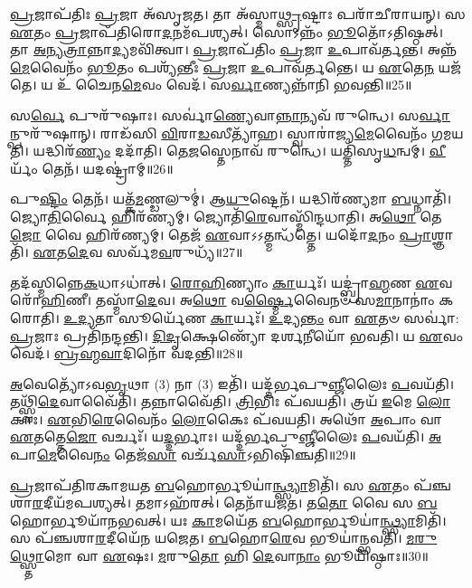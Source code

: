 \-\ul{𑌪𑍍𑌰}\-𑌜𑌾\-𑌪᳴𑌤𑌿𑌃 \ul{𑌪𑍍𑌰}\-𑌜𑌾 𑌅᳴\-𑌸𑍃𑌜𑌤।
𑌤𑌾 𑌅᳴𑌸𑍍𑌮𑌾\-\ul{𑌥𑍍𑌸𑍃}\-𑌷𑍍𑌟𑌾𑌃 𑌪𑌰𑌾᳴𑌚𑍀𑌰𑌾𑌯𑌨𑍍।
𑌸 \ul{𑌏}\-𑌤𑌂 \ul{𑌪𑍍𑌰}\-𑌜𑌾𑌪᳴𑌤𑌿𑌰𑍋\-\ul{𑌦}\-𑌨𑌮᳴𑌪𑌶𑍍𑌯𑌤𑍍।
𑌸𑍋𑌽𑌨𑍍𑌨𑌂᳴ \ul{𑌭𑍂}\-𑌤𑍋᳴\-𑌽𑌤𑌿𑌷𑍍𑌠𑌤𑍍।
𑌤𑌾 \ul{𑌅}\-𑌨𑍍𑌯\-\ul{𑌤𑍍𑌰𑌾}\-𑌨𑍍𑌨𑌾\-\ul{𑌦𑍍𑌯}\-𑌮𑌵𑌿᳴𑌤𑍍𑌵𑌾।
\-\ul{𑌪𑍍𑌰}\-𑌜𑌾𑌪᳴𑌤𑌿𑌂 \ul{𑌪𑍍𑌰}\-𑌜𑌾 \ul{𑌉}\-𑌪𑌾𑌵᳴𑌰𑍍𑌤𑌨𑍍𑌤।
𑌅𑌨𑍍𑌨᳴\-\ul{𑌮𑍇}\-𑌵𑍈𑌨𑌂᳴ \ul{𑌭𑍂}\-𑌤𑌂 𑌪𑌶𑍍𑌯᳴𑌨𑍍𑌤𑍀𑌃 \ul{𑌪𑍍𑌰}\-𑌜𑌾 \ul{𑌉}\-𑌪𑌾𑌵᳴𑌰𑍍𑌤𑌨𑍍𑌤𑍇।
𑌯 \ul{𑌏}\-𑌤𑍇\-\ul{𑌨} 𑌯𑌜᳴𑌤𑍇।
𑌯 𑌉᳴ 𑌚𑍈𑌨\-\ul{𑌮𑍇}\-𑌵𑌂 𑌵𑍇𑌦᳴।
𑌸\-\ul{𑌰𑍍𑌵𑌾}\-𑌣𑍍𑌯𑌨𑍍𑌨𑌾᳴𑌨𑌿 𑌭𑌵𑌨𑍍𑌤𑌿॥25॥

𑌸\-\ul{𑌰𑍍𑌵𑍇} 𑌪𑍁𑌰𑍁᳴𑌷𑌾𑌃।
𑌸𑌰𑍍𑌵𑌾॑\-\ul{𑌣𑍍𑌯𑍇}\-𑌵𑌾\-\ul{𑌨𑍍𑌨𑌾}\-𑌨𑍍𑌯𑌵᳴ 𑌰𑍁𑌨𑍍𑌧𑍇।
𑌸\-\ul{𑌰𑍍𑌵𑌾}\-𑌨𑍍𑌪𑍁𑌰𑍁᳴𑌷𑌾𑌨𑍍।
𑌰𑌾𑌡᳴𑌸𑌿 \ul{𑌵𑌿}\-𑌰𑌾\-\ul{𑌡}\-𑌸𑍀𑌤𑍍𑌯𑌾᳴𑌹।
𑌸𑍍𑌵𑌾𑌰𑌾॑𑌜𑍍𑌯\-\ul{𑌮𑍇}\-𑌵𑍈𑌨𑌂᳴ 𑌗𑌮𑌯𑌤𑌿।
𑌯𑌦𑍍𑌧𑌿𑌰᳴\-\ul{𑌣𑍍𑌯𑌂} 𑌦𑌦𑌾᳴𑌤𑌿।
𑌤𑍇\-\ul{𑌜}\-𑌸𑍍𑌤𑍇𑌨𑌾𑌵᳴ 𑌰𑍁𑌨𑍍𑌧𑍇।
𑌯𑌤𑍍𑌤𑌿᳴𑌸𑍃\-\ul{𑌧}\-𑌨𑍍𑌵𑌮𑍍।
\-\ul{𑌵𑍀}\-𑌰𑍍𑌯𑌂᳴ 𑌤𑍇𑌨᳴।
𑌯𑌦𑌷𑍍𑌟𑍍𑌰𑌾॑𑌮𑍍॥26॥

𑌪𑍁\-\ul{𑌷𑍍𑌟𑌿𑌂} 𑌤𑍇𑌨᳴।
𑌯𑌤𑍍𑌕᳴\-\ul{𑌮}\-𑌣𑍍𑌡𑌲𑍁𑌮𑍍॑।
𑌆\-\ul{𑌯𑍁}\-𑌷𑍍𑌟𑍇𑌨᳴।
𑌯𑌦𑍍𑌧𑌿𑌰᳴𑌣𑍍𑌯𑌮𑌾 \ul{𑌬}\-𑌧𑍍𑌨𑌾𑌤𑌿᳴।
𑌜𑍍𑌯𑍋\-\ul{𑌤𑌿}\-𑌰𑍍𑌵𑍈 𑌹𑌿𑌰᳴𑌣𑍍𑌯𑌮𑍍।
𑌜𑍍𑌯𑍋𑌤𑌿᳴\-\ul{𑌰𑍇}\-𑌵𑌾𑌸𑍍𑌮𑌿᳴𑌨𑍍𑌦𑌧𑌾𑌤𑌿।
𑌅\-\ul{𑌥𑍋} 𑌤𑍇\-\ul{𑌜𑍋} 𑌵𑍈 𑌹𑌿𑌰᳴𑌣𑍍𑌯𑌮𑍍।
𑌤𑍇𑌜᳴ \ul{𑌏}\-𑌵𑌾𑌽𑌽𑌤𑍍𑌮𑌨𑍍𑌧᳴𑌤𑍍𑌤𑍇।
𑌯𑌦𑍋᳴\-\ul{𑌦}\-𑌨𑌂 \ul{𑌪𑍍𑌰𑌾}\-𑌶𑍍𑌞𑌾𑌤𑌿᳴।
\-\ul{𑌏}\-𑌤\-\ul{𑌦𑍇}\-𑌵 𑌸𑌰𑍍𑌵᳴𑌮\-\ul{𑌵}\-𑌰𑍁𑌧𑍍𑌯᳴॥27॥

𑌤𑌦᳴𑌸𑍍𑌮𑌿𑌨𑍍𑌨𑍇\-\ul{𑌕}\-𑌧𑌾\-𑌽𑌧𑌾॑𑌤𑍍।
\-\ul{𑌰𑍋}\-\-\ul{𑌹𑌿}\-𑌣𑍍𑌯𑌾𑌂 \ul{𑌕𑌾}\-𑌰𑍍𑌯𑌃᳴।
𑌯𑌦𑍍𑌬𑍍𑌰𑌾॑\-\ul{𑌹𑍍𑌮}\-𑌣 \ul{𑌏}\-𑌵 𑌰𑍋᳴\-\ul{𑌹𑌿}\-𑌣𑍀।
𑌤𑌸𑍍𑌮𑌾᳴\-\ul{𑌦𑍇}\-𑌵।
𑌅\-\ul{𑌥𑍋} 𑌵\-\ul{𑌰𑍍𑌷𑍍𑌮𑍈}\-𑌵𑍈𑌨𑍞᳴ 𑌸\-\ul{𑌮𑌾}\-𑌨𑌾𑌨𑌾𑌂॑ 𑌕𑌰𑍋𑌤𑌿।
\-\ul{𑌉}\-\-\ul{𑌦𑍍𑌯}\-𑌤𑌾 𑌸𑍂𑌰𑍍𑌯𑍇᳴𑌣 \ul{𑌕𑌾}\-𑌰𑍍𑌯𑌃᳴।
\-\ul{𑌉}\-𑌦𑍍𑌯\-\ul{𑌨𑍍𑌤𑌂} 𑌵𑌾 \ul{𑌏}\-𑌤𑍞 𑌸𑌰𑍍𑌵𑌾॑: \ul{𑌪𑍍𑌰}\-𑌜𑌾𑌃 𑌪𑍍𑌰𑌤𑌿᳴\-𑌨𑌨𑍍𑌦𑌨𑍍𑌤𑌿।
\-\ul{𑌦𑌿}\-\-\ul{𑌦𑍃}\-𑌕𑍍𑌷𑍇𑌣𑍍𑌯𑍋᳴ 𑌦𑌰𑍍\mbox{}\-\ul{𑌶}\-𑌨𑍀𑌯𑍋᳴ 𑌭𑌵𑌤𑌿।
𑌯 \ul{𑌏}\-𑌵𑌂 𑌵𑍇𑌦᳴।
\-\ul{𑌬𑍍𑌰}\-\-\ul{𑌹𑍍𑌮}\-\-\ul{𑌵𑌾}\-𑌦𑌿𑌨𑍋᳴ 𑌵𑌦𑌨𑍍𑌤𑌿॥28॥

\-\ul{𑌅}\-𑌵𑍇𑌤𑍍𑌯𑍋᳴\-𑌽𑌵\-\ul{𑌭𑍃}\-𑌥𑌾 (3) 𑌨𑌾 (3) 𑌇𑌤𑌿᳴।
𑌯𑌦𑍍𑌦᳴𑌰𑍍𑌭𑌪𑍁\-\ul{𑌞𑍍𑌜𑍀}\-𑌲𑍈𑌃 \ul{𑌪}\-𑌵𑌯᳴𑌤𑌿।
𑌤𑌥𑍍𑌸𑍍𑌵𑌿᳴\-\ul{𑌦𑍇}\-𑌵𑌾𑌵𑍈᳴𑌤𑌿।
𑌤𑌨𑍍𑌨𑌾𑌵𑍈᳴𑌤𑌿।
\-\ul{𑌤𑍍𑌰𑌿}\-𑌭𑌿𑌃 𑌪᳴𑌵𑌯𑌤𑌿।
𑌤𑍍𑌰𑌯᳴ \ul{𑌇}\-𑌮𑍇 \ul{𑌲𑍋}\-𑌕𑌾𑌃।
\-\ul{𑌏}\-𑌭𑌿\-\ul{𑌰𑍇}\-𑌵𑍈𑌨𑌂᳴ \ul{𑌲𑍋}\-𑌕𑍈𑌃 𑌪᳴𑌵𑌯𑌤𑌿।
𑌅𑌥𑍋᳴ \ul{𑌅}\-𑌪𑌾𑌂 𑌵𑌾 \ul{𑌏}\-𑌤𑌤𑍍𑌤𑍇\-\ul{𑌜𑍋} 𑌵𑌰𑍍𑌚𑌃᳴।
𑌯\-\ul{𑌦𑍍𑌦}\-𑌰𑍍𑌭𑌾𑌃।
𑌯𑌦𑍍𑌦᳴𑌰𑍍𑌭𑌪𑍁\-\ul{𑌞𑍍𑌜𑍀}\-𑌲𑍈𑌃 \ul{𑌪}\-𑌵𑌯᳴𑌤𑌿।
\-\ul{𑌅}\-𑌪𑌾\-\ul{𑌮𑍇}\-𑌵𑍈\-\ul{𑌨𑌂} 𑌤𑍇𑌜᳴\-\ul{𑌸𑌾} 𑌵𑌰𑍍𑌚᳴\-\ul{𑌸𑌾}\-\-𑌽𑌭𑌿𑌷𑌿᳴𑌞𑍍𑌚𑌤𑌿॥29॥\anuvakamend[\-\ul{𑌭}\-\-\ul{𑌵}\-𑌨𑍍𑌤𑍍𑌯𑌷𑍍𑌟𑍍𑌰𑌾᳴𑌮\-\ul{𑌵}\-𑌰𑍁𑌧𑍍𑌯᳴ 𑌵𑌦𑌨𑍍𑌤𑌿 \ul{𑌦}\-𑌰𑍍𑌭𑌾 𑌯𑌦𑍍𑌦᳴𑌰𑍍𑌭𑌪𑍁\-\ul{𑌞𑍍𑌜𑍀}\-𑌲𑍈𑌃 \ul{𑌪}\-𑌵\-\ul{𑌯}\-𑌤𑍍𑌯𑍇𑌕𑌂᳴ 𑌚]

\-\ul{𑌪𑍍𑌰}\-𑌜𑌾𑌪᳴𑌤𑌿𑌰𑌕𑌾𑌮𑌯𑌤 \ul{𑌬}\-𑌹𑍋𑌰𑍍𑌭𑍂𑌯𑌾॑\-\ul{𑌨𑍍𑌥𑍍𑌸𑍍𑌯𑌾}\-𑌮𑌿𑌤𑌿᳴।
𑌸 \ul{𑌏}\-𑌤𑌂 𑌪᳴𑌞𑍍𑌚𑌶𑌾\-\ul{𑌰}\-𑌦𑍀𑌯᳴𑌮𑌪𑌶𑍍𑌯𑌤𑍍।
𑌤𑌮𑌾𑌽𑌹᳴𑌰𑌤𑍍।
𑌤𑍇𑌨𑌾᳴𑌯𑌜𑌤।
𑌤\-\ul{𑌤𑍋} 𑌵𑍈 𑌸 \ul{𑌬}\-𑌹𑍋𑌰𑍍𑌭𑍂𑌯𑌾᳴𑌨𑌭𑌵𑌤𑍍।
𑌯𑌃 \ul{𑌕𑌾}\-𑌮𑌯𑍇᳴𑌤 \ul{𑌬}\-𑌹𑍋𑌰𑍍𑌭𑍂𑌯𑌾॑\-\ul{𑌨𑍍𑌥𑍍𑌸𑍍𑌯𑌾}\-𑌮𑌿𑌤𑌿᳴।
𑌸 𑌪᳴𑌞𑍍𑌚𑌶𑌾\-\ul{𑌰}\-𑌦𑍀𑌯𑍇᳴𑌨 𑌯𑌜𑍇𑌤।
\-\ul{𑌬}\-𑌹𑍋\-\ul{𑌰𑍇}\-𑌵 𑌭𑍂𑌯𑌾॑𑌨𑍍𑌭𑌵𑌤𑌿।
\-\ul{𑌮}\-\-\ul{𑌰𑍁}\-\-\ul{𑌥𑍍𑌸𑍍𑌤𑍋}\-𑌮𑍋 𑌵𑌾 \ul{𑌏}\-𑌷𑌃।
\-\ul{𑌮}\-𑌰𑍁\-\ul{𑌤𑍋} 𑌹𑌿 \ul{𑌦𑍇}\-𑌵𑌾\-\ul{𑌨𑌾𑌂} 𑌭𑍂𑌯𑌿᳴𑌷𑍍𑌠𑌾𑌃॥30॥

